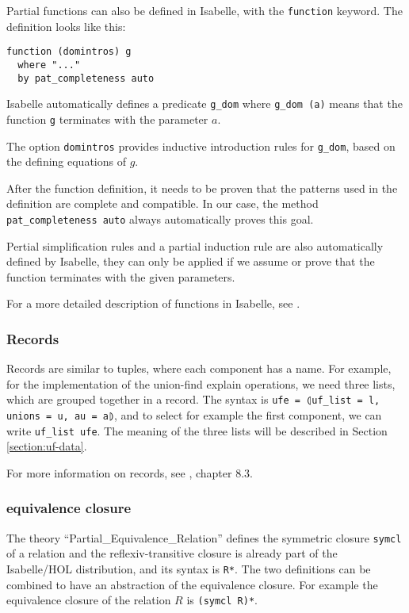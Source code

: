 Partial functions can also be defined in Isabelle, with the \lstinline{function} keyword.
The definition looks like this:

\begin{lstlisting}
function (domintros) g
  where "..."
  by pat_completeness auto
\end{lstlisting}

Isabelle automatically defines a predicate \lstinline|g_dom| where \lstinline{g_dom (a)} means that the function \lstinline|g| terminates with the parameter $a$.

The option \lstinline{domintros} provides inductive introduction rules for \lstinline|g_dom|, based on the defining equations of $g$.

After the function definition, it needs to be proven that the patterns used in the definition are complete and compatible. In our case, the method \lstinline|pat_completeness auto| always automatically proves this goal.

Pertial simplification rules and a partial induction rule are also automatically defined by Isabelle, they can only be applied if we assume or prove that the function terminates with the given parameters.

For a more detailed description of functions in Isabelle, see \cite{functions}.

\subsubsection{Records}

Records are similar to tuples, where each component has a name. For example, for the implementation of the union-find explain operations, we need three lists, which are grouped together in a record. The syntax is \lstinline{ufe = ⦇uf_list = l, unions = u, au = a⦈}, and to select for example the first component, we can write \lstinline{uf_list ufe}. The meaning of the three lists will be described in Section \ref{section:uf-data}.

For more information on records, see \cite{isabelle}, chapter 8.3.

\subsubsection{equivalence closure}

The theory ``Partial\_Equivalence\_Relation''\cite{Collections-AFP} defines the symmetric closure \lstinline{symcl} of a relation and the reflexiv-transitive closure is already part of the Isabelle/HOL distribution, and its syntax is \lstinline{R*}. The two definitions can be combined to have an abstraction of the equivalence closure. For example the equivalence closure of the relation $R$ is \lstinline{(symcl R)*}.


